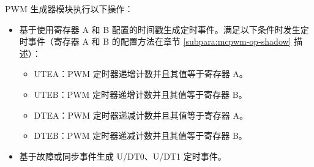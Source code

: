 \documentclass[main\_\_CN.tex]{subfiles}
\begin{document}
PWM 生成器模块执行以下操作：
\begin{itemize}
    \item 基于使用寄存器 A 和 B 配置的时间戳生成定时事件。满足以下条件时发生定时事件（寄存器 A 和 B 的配置方法在章节 \ref{subpara:mcpwm-op-shadow} 描述）：
    \begin{itemize}
        \item UTEA：PWM 定时器递增计数并且其值等于寄存器 A。
        \item UTEB：PWM 定时器递增计数并且其值等于寄存器 B。
        \item DTEA：PWM 定时器递减计数并且其值等于寄存器 A。
        \item DTEB：PWM 定时器递减计数并且其值等于寄存器 B。
    \end{itemize}
    \item 基于故障或同步事件生成 U/DT0、U/DT1 定时事件。


\end{itemize}
\end{document}
